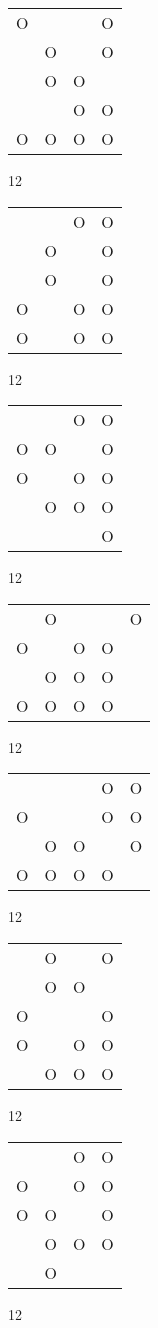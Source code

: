 \begin{tabular}{|m{0.2cm}m{0.2cm}m{0.2cm}m{0.2cm}|}\hline
O& & &O\\
 &O& &O\\
 &O&O& \\
 & &O&O\\
O&O&O&O\\
\hline\end{tabular}12
\begin{tabular}{|m{0.2cm}m{0.2cm}m{0.2cm}m{0.2cm}|}\hline
 & &O&O\\
 &O& &O\\
 &O& &O\\
O& &O&O\\
O& &O&O\\
\hline\end{tabular}12
\begin{tabular}{|m{0.2cm}m{0.2cm}m{0.2cm}m{0.2cm}|}\hline
 & &O&O\\
O&O& &O\\
O& &O&O\\
 &O&O&O\\
 & & &O\\
\hline\end{tabular}12
\begin{tabular}{|m{0.2cm}m{0.2cm}m{0.2cm}m{0.2cm}m{0.2cm}|}\hline
 &O& & &O\\
O& &O&O& \\
 &O&O&O& \\
O&O&O&O& \\
\hline\end{tabular}12
\begin{tabular}{|m{0.2cm}m{0.2cm}m{0.2cm}m{0.2cm}m{0.2cm}|}\hline
 & & &O&O\\
O& & &O&O\\
 &O&O& &O\\
O&O&O&O& \\
\hline\end{tabular}12
\begin{tabular}{|m{0.2cm}m{0.2cm}m{0.2cm}m{0.2cm}|}\hline
 &O& &O\\
 &O&O& \\
O& & &O\\
O& &O&O\\
 &O&O&O\\
\hline\end{tabular}12
\begin{tabular}{|m{0.2cm}m{0.2cm}m{0.2cm}m{0.2cm}|}\hline
 & &O&O\\
O& &O&O\\
O&O& &O\\
 &O&O&O\\
 &O& & \\
\hline\end{tabular}12
